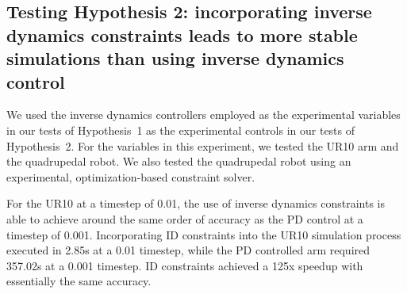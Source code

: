 \documentclass[conference]{IEEEtran}
\begin{document}
\subsection{Testing Hypothesis 2: incorporating inverse dynamics constraints leads to more stable simulations than using inverse dynamics control}
\label{section:hypo2}



We used the inverse dynamics controllers employed as the experimental variables in our tests of Hypothesis~1 as the experimental controls in our tests of Hypothesis~2. For the variables in this experiment, we tested the UR10 arm and the quadrupedal robot. We also tested the quadrupedal robot using an experimental, optimization-based constraint solver. 

For the UR10 at a timestep of 0.01, the use of inverse dynamics constraints is able to achieve around the same order of accuracy as the PD control at a timestep of 0.001. Incorporating ID constraints into the UR10 simulation process executed in 2.85s at a 0.01 timestep, while the PD controlled arm required 357.02s at a 0.001 timestep. ID constraints achieved a 125x speedup with essentially the same accuracy.


\end{document}
